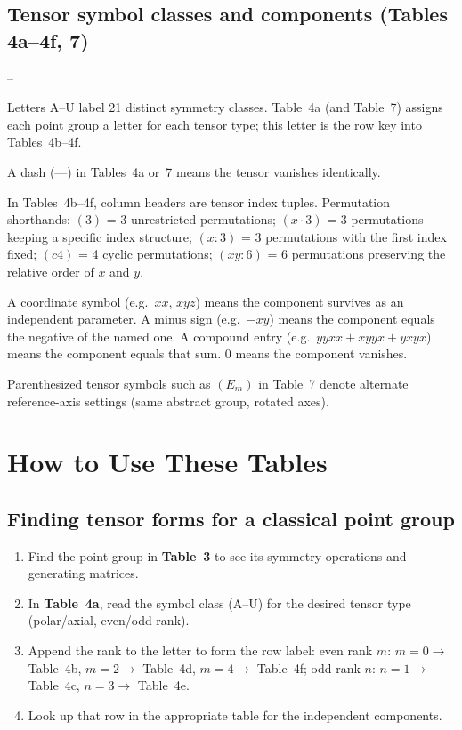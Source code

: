 \documentclass[a4paper,11pt]{article}
\newenvironment{notelist}{%
  \begin{list}{--}{%
    \setlength{\topsep}{2pt}%
    \setlength{\itemsep}{1pt}%
    \setlength{\parsep}{0pt}%
    \setlength{\leftmargin}{1.5em}%
  }%
}{\end{list}}
\begin{document}
\subsection*{Tensor symbol classes and components (Tables 4a--4f, 7)}
\begin{notelist}
\item Letters A--U label 21 distinct symmetry classes. Table~4a (and Table~7)
  assigns each point group a letter for each tensor type; this letter is the
  row key into Tables~4b--4f.
\item A dash (---) in Tables~4a or~7 means the tensor vanishes identically.
\item In Tables~4b--4f, column headers are tensor index tuples.
  Permutation shorthands: $(3)$ = 3 unrestricted permutations;
  $(x{\cdot}3)$ = 3 permutations keeping a specific index structure;
  $(x{:}3)$ = 3 permutations with the first index fixed;
  $(c4)$ = 4 cyclic permutations;
  $(xy{:}6)$ = 6 permutations preserving the relative order of $x$ and $y$.
\item A coordinate symbol (e.g.\ $xx$, $xyz$) means the component survives as an
  independent parameter. A minus sign (e.g.\ $-xy$) means the component equals
  the negative of the named one. A compound entry (e.g.\ $yyxx{+}xyyx{+}yxyx$)
  means the component equals that sum. $0$ means the component vanishes.
\item Parenthesized tensor symbols such as $(E_m)$ in Table~7 denote alternate
  reference-axis settings (same abstract group, rotated axes).
\end{notelist}

\section{How to Use These Tables}

\subsection*{Finding tensor forms for a classical point group}
\begin{enumerate}\setlength{\itemsep}{1pt}
\item Find the point group in \textbf{Table~3} to see its symmetry operations and
  generating matrices.
\item In \textbf{Table~4a}, read the symbol class (A--U) for the desired tensor type
  (polar/axial, even/odd rank).
\item Append the rank to the letter to form the row label:
  even rank $m$: $m=0 \to$ Table~4b, $m=2 \to$ Table~4d, $m=4 \to$ Table~4f;
  odd rank $n$: $n=1 \to$ Table~4c, $n=3 \to$ Table~4e.
\item Look up that row in the appropriate table for the independent components.
\end{enumerate}
\end{document}
